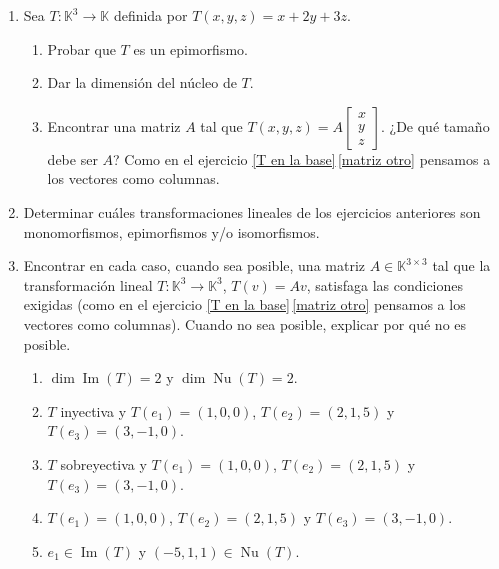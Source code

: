 \begin{enumerate}[topsep=6pt, itemsep=.4cm]
    \rta
    
    \item\label{funcional ej}  Sea $T:\mathbb{K}^3\longrightarrow\mathbb{K}$ definida por $T(x,y,z)=x+2y+3z$.
    \begin{enumerate}
        \item\label{funcional ej a} Probar que $T$ es un epimorfismo.
        \item\label{funcional ej b} Dar la dimensión del núcleo de $T$.
        \item\label{funcional ej c} Encontrar una matriz $A$ tal que
            $T(x,y,z)=A\begin{bmatrix}
            x\\y\\z \end{bmatrix}$. ¿De qué tamaño debe ser $A$? Como en el ejercicio \ref{T en la base}\,\ref{matriz otro} pensamos a los vectores como columnas. 
    \end{enumerate}

    \rta
    
    
    \item Determinar cuáles transformaciones lineales de los ejercicios anteriores son monomorfismos, epimorfismos y/o isomorfismos.
    
    \rta


    \item\label{usar-1} Encontrar en cada caso, cuando sea posible, una matriz $A\in\mathbb{K}^{3\times 3}$ tal que la transformación lineal $T:\mathbb{K}^3\longrightarrow\mathbb{K}^3$, $T(v)=Av$, satisfaga las condiciones exigidas (como en el ejercicio  \ref{T en la base}\,\ref{matriz otro} pensamos a los vectores como columnas). Cuando no sea posible, explicar por qué no es posible.
    \begin{enumerate}[ topsep=5pt,itemsep=5pt]
        \item\label{usar-1 a} $\operatorname{dim} \operatorname{Im}(T)=2$ y $\operatorname{dim}\operatorname{Nu}(T)=2$.
        \item\label{usar-1 b} $T$ inyectiva y $T(e_1)=(1,0,0)$, $T(e_2)=(2,1,5)$ y $T(e_3)=(3,-1,0)$.
        \item\label{usar-1 c} $T$ sobreyectiva y $T(e_1)=(1,0,0)$, $T(e_2)=(2,1,5)$ y $T(e_3)=(3,-1,0)$.
        
        \item\label{usar Txyz} $T(e_1)=(1,0,0)$, $T(e_2)=(2,1,5)$ y $T(e_3)=(3,-1,0)$.
        
        \item\label{usar-1 e} $e_1\in\operatorname{Im}(T)$ y $(-5,1,1)\in\operatorname{Nu}(T)$.
        

\end{enumerate}
\end{enumerate}
